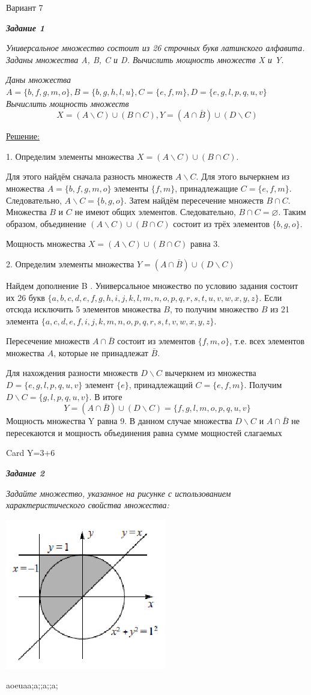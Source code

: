 \documentclass[11pt]{article}
\let\emptyset\varnothing
\begin{document}
	\begin{center}
	Вариант 7
	\end{center}
	
	\textit{\textbf{Задание 1}}

	\textit{Универсальное множество состоит из 26 строчных букв латинского
алфавита. Заданы множества A, B, C и D. Вычислить мощность множеств X
и Y.}

\textit{Даны множества
$A=\{b,f,g,m,o\}, B=\{b,g,h,l,u\}, C=\{e,f,m\}, D=\{e,g,l,p,q,u,v\}$\\
Вычислить мощность множеств}
$$X = (A \backslash C) \cup (B \cap C),
Y=(A \cap \bar B) \cup (D \backslash C) $$

\underline{Решение:}

1. Определим элементы множества 
$X = (A \backslash C) \cup (B \cap C)$.

Для этого найдём сначала разность множеств $A \backslash C$.
Для этого вычеркнем из множества $A=\{b,f,g,m,o\}$ элементы
$\{f, m\}$, принадлежащие $C=\{e,f,m\}$. Следовательно,
$A \backslash C = \{b, g, o\}$.
Затем найдём пересечение множеств $B \cap C$.
Множества $B$ и $C$ не имеют общих элементов. Следовательно,
$B \cap C = \emptyset$.
Таким образом, объединение $(A \backslash C) \cup (B \cap C)$ состоит из
трёх элементов $\{b, g, o\}$.

Мощность множества 
$X = (A \backslash C) \cup (B \cap C)$ равна 3.

2. Определим элементы множества 
$Y=(A \cap \bar B) \cup (D \backslash C)$

Найдем дополнение B . Универсальное множество по условию задания
состоит их 26 букв
$\{a,b,c,d,e,f,g,h,i,j,k,l,m,n,o,p,q,r,s,t,u,v,w,x,y,z\}$.
Если отсюда исключить 5 элементов множества $B$, то получим множество
$B$ из 21 элемента
$\{a,c,d,e,f,i,j,k,m,n,o,p,q,r,s,t,v,w,x,y,z\}$.

Пересечение множеств $A \cap \bar B$
состоит из элементов $\{f, m, o\}$, т.е. всех
элементов множества $A$, которые не принадлежат $\bar B$.

Для нахождения разности множеств $D \backslash C$ вычеркнем из множества
$D=\{e,g,l,p,q,u,v\}$
элемент $\{e\}$, принадлежащий
$C=\{e,f,m\}$. Получим
$D \backslash C = \{g, l, p, q, u, v\}$. В итоге\\
$$Y=(A \cap \bar B) \cup (D \backslash C) = \{f,g,l,m,o,p,q,u,v\}$$
Мощность множества Y равна 9. В данном случае множества $D \backslash C$
и $A \cap \bar B$ не пересекаются и мощность объединения равна
сумме мощностей слагаемых

Card Y=3+6

\pagebreak

\textit{\textbf{Задание 2}}

\textit{Задайте множество, указанное на рисунке с использованием
характеристического свойства множества:}

\includegraphics[scale=0.8]{task2}

aoeuaa;a;;a;;a;
\end{document}
